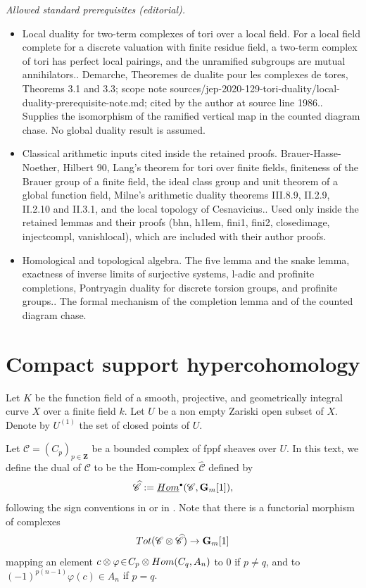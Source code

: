 \documentclass[10pt,a4paper]{amsart}
\let\mathcal\mathscr
\newcommand{\sbullet}{{\scriptscriptstyle\bullet}}
\theoremstyle{plain}
\theoremstyle{definition}
\newcommand \ZZ {\mathbf{Z}}
\newcommand \Gm {\mathbf{G}_m}\let\G\Gm
\newcommand \cC {\mathcal{C}}
\begin{document}
\noindent\textit{Allowed standard prerequisites (editorial).}\begin{itemize}
\item Local duality for two-term complexes of tori over a local field. For a local field complete for a discrete valuation with finite residue field, a two-term complex of tori has perfect local pairings, and the unramified subgroups are mutual annihilators.. Demarche, Theoremes de dualite pour les complexes de tores, Theorems 3.1 and 3.3; scope note sources/jep-2020-129-tori-duality/local-duality-prerequisite-note.md; cited by the author at source line 1986.. Supplies the isomorphism of the ramified vertical map in the counted diagram chase. No global duality result is assumed.
\item Classical arithmetic inputs cited inside the retained proofs. Brauer-Hasse-Noether, Hilbert 90, Lang's theorem for tori over finite fields, finiteness of the Brauer group of a finite field, the ideal class group and unit theorem of a global function field, Milne's arithmetic duality theorems III.8.9, II.2.9, II.2.10 and II.3.1, and the local topology of Cesnavicius.. Used only inside the retained lemmas and their proofs (bhn, h1lem, fini1, fini2, closedimage, injectcompl, vanishlocal), which are included with their author proofs.
\item Homological and topological algebra. The five lemma and the snake lemma, exactness of inverse limits of surjective systems, l-adic and profinite completions, Pontryagin duality for discrete torsion groups, and profinite groups.. The formal mechanism of the completion lemma and of the counted diagram chase.
\end{itemize}\medskip
\section{Compact support hypercohomology} \label{one}

Let $K$ be the function field of a smooth, projective, and geometrically
integral curve $X$ over a finite field $k$. Let $U$ be a non empty
Zariski open subset of $X$. Denote by $U^{(1)}$ the set of closed points
of $U$.

Let $\cC=(C_p)_{p \in \ZZ}$
be a bounded complex of fppf sheaves over $U$. In this text, we define the dual of $\cC$ to be the Hom-complex $\widehat{\cC}$ defined by
\[
\widehat{\cC}:= \underline{\textup{Hom}}^\sbullet(\cC, \Gm[1]),
\]
following the sign conventions in \cite[Tag 0A8H]{SP} or in \cite[X.5.1]{bkiac}.
Note that there is a functorial morphism of complexes
\[
\textup{Tot}(\cC \otimes \widehat{\cC}) \to \Gm[1]
\]
mapping an element $c \otimes \varphi\!\in\!C_p \otimes \textup{Hom}(C_q, A_n)$ to $0$ if $p\!\neq\!q$, and to $(-1)^{p (n-1)} \varphi(c)\!\in\!A_n$ if $p=q$.
\end{document}
